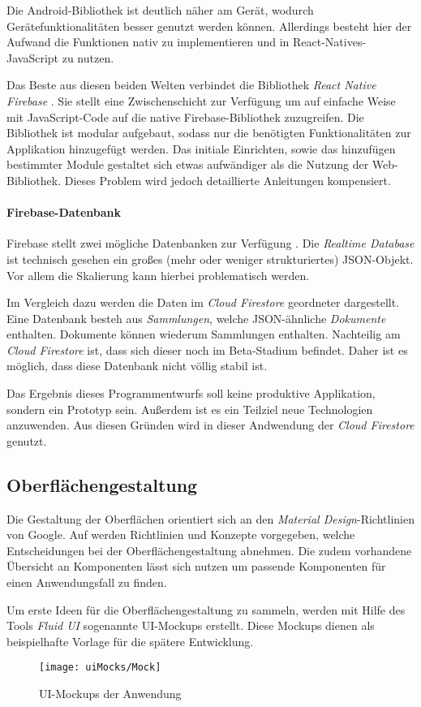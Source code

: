 Die Android-Bibliothek ist deutlich näher am Gerät, wodurch Gerätefunktionalitäten besser genutzt werden können.
Allerdings besteht hier der Aufwand die Funktionen nativ zu implementieren und in React-Natives-JavaScript zu nutzen.

Das Beste aus diesen beiden Welten verbindet die Bibliothek \textit{React Native Firebase} \cite{invertas78:online}.
Sie stellt eine Zwischenschicht zur Verfügung um auf einfache Weise mit JavaScript-Code auf die native Firebase-Bibliothek zuzugreifen.
Die Bibliothek ist modular aufgebaut, sodass nur die benötigten Funktionalitäten zur Applikation hinzugefügt werden.
Das initiale Einrichten, sowie das hinzufügen bestimmter Module gestaltet sich etwas aufwändiger als die Nutzung der Web-Bibliothek.
Dieses Problem wird jedoch detaillierte Anleitungen kompensiert.

\paragraph{Firebase-Datenbank}
Firebase stellt zwei mögliche Datenbanken zur Verfügung \cite{ChooseaD77:online}.
Die \textit{Realtime Database} ist technisch gesehen ein großes (mehr oder weniger strukturiertes) JSON-Objekt.
Vor allem die Skalierung kann hierbei problematisch werden.

Im Vergleich dazu werden die Daten im \textit{Cloud Firestore} geordneter dargestellt.
Eine Datenbank besteh aus \textit{Sammlungen}, welche JSON-ähnliche \textit{Dokumente} enthalten.
Dokumente können wiederum Sammlungen enthalten.
Nachteilig am \textit{Cloud Firestore} ist, dass sich dieser noch im Beta-Stadium befindet.
Daher ist es möglich, dass diese Datenbank nicht völlig stabil ist.

Das Ergebnis dieses Programmentwurfs soll keine produktive Applikation, sondern ein Prototyp sein.
Außerdem ist es ein Teilziel neue Technologien anzuwenden.
Aus diesen Gründen wird in dieser Andwendung der \textit{Cloud Firestore} genutzt.

\subsection{Oberflächengestaltung}
Die Gestaltung der Oberflächen orientiert sich an den \textit{Material Design}-Richtlinien von Google.
Auf \cite{DesignMa49:online} werden Richtlinien und Konzepte vorgegeben,
welche Entscheidungen bei der Oberflächengestaltung abnehmen.
Die zudem vorhandene Übersicht an Komponenten lässt sich nutzen um passende Komponenten für einen Anwendungsfall zu finden.

Um erste Ideen für die Oberflächengestaltung zu sammeln,
werden mit Hilfe des Tools \textit{Fluid UI} \cite{FluidUIc8:online} sogenannte UI-Mockups erstellt.
Diese Mockups dienen als beispielhafte Vorlage für die spätere Entwicklung.


\begin{figure}[h]
    \centering
    \texttt{[image: uiMocks/Mock]}
    \caption{UI-Mockups der Anwendung}
\end{figure}



